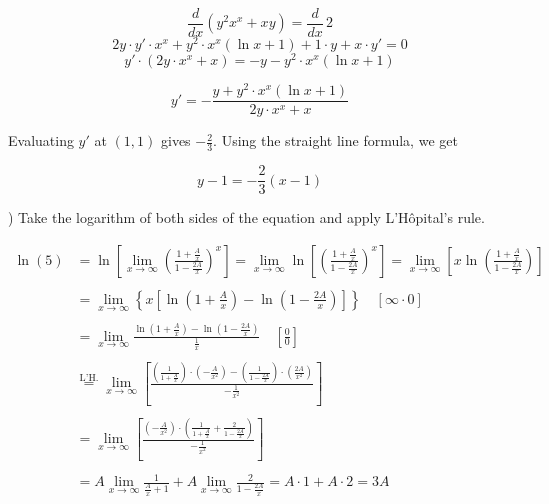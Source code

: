\documentclass{article}
\begin{document}
\[\frac d{dx}\left(y^2x^x + xy\right) = \frac d{dx}\,2\]
\[2y\cdot y'\cdot x^x + y^2\cdot x^x(\ln x+1)+1\cdot y +x\cdot y'=0\]
\[y'\cdot\left(2y\cdot x^x + x\right)=-y-y^2\cdot x^x(\ln x+1)\]

\[y'=-\frac{y+y^2\cdot x^x(\ln x+1)}{2y\cdot x^x+x}\]

\hfill

\noindent Evaluating $y'$ at $(1,1)$ gives $\displaystyle-\frac23$. Using the straight line formula, we get

\begin{equation*}
\boxed{y-1 =-\frac23(x-1)}
\end{equation*}

\newpage

) Take the logarithm of both sides of the equation and apply L'Hôpital's rule.

\begin{align*}
\ln(5)&=\ln\left[\lim_{x\to\infty}\left(\frac{\displaystyle1+\frac Ax}{\displaystyle1-\frac {2A}x}\right)^{x}\right]=\lim_{x\to\infty}\ln\left[\left(\frac{\displaystyle1+\frac Ax}{\displaystyle1-\frac {2A}x}\right)^{x}\right]=\lim_{x\to\infty}\left[x\ln\left(\frac{\displaystyle1+\frac Ax}{\displaystyle1-\frac {2A}x}\right)\right]\\\\&=\lim_{x\to\infty}\left\{x\left[\ln\left(1+\frac Ax\right)-\ln\left(1-\frac {2A}x\right)\right]\right\}\quad\left[\infty\cdot0\right]\\\\&=\lim_{x\to\infty}\frac{\displaystyle\ln\left(1+\frac Ax\right)-\ln\left(1-\frac {2A}x\right)}{\displaystyle\frac1x}\quad\left[\frac00\right]\\\\&\overset{\text{L'H.}}{=}\lim_{x\to\infty}\left[\frac{\displaystyle\left(\frac1{1+\frac Ax}\right)\cdot\left(-\frac{A}{x^2}\right)-\left(\frac1{1-\frac{2A}x}\right)\cdot\left(\frac{2A}{x^2}\right)}{\displaystyle -\frac1{x^2}}\right]\\\\&=\lim_{x\to\infty}\left[\frac{\displaystyle\left(-\frac{A}{x^2}\right)\cdot\left(\frac1{1+\frac{A}x}+\frac{2}{1-\frac{2A}x}\right)}{\displaystyle-\frac{1}{x^2}}\right]\\\\&=A\lim_{x\to\infty}\frac1{\frac Ax + 1}+A\lim_{x\to\infty}\frac2{1-\frac{2A}x} = A \cdot 1 + A \cdot 2 = 3A
\end{align*}

\hfill
\end{document}
